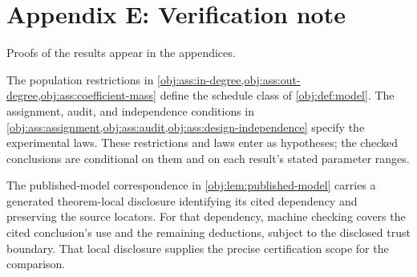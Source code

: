 \section{Appendix E: Verification note}

Proofs of the results appear in the appendices.

The population restrictions in \cref{obj:ass:in-degree,obj:ass:out-degree,obj:ass:coefficient-mass} define the schedule class of \cref{obj:def:model}. The assignment, audit, and independence conditions in \cref{obj:ass:assignment,obj:ass:audit,obj:ass:design-independence} specify the experimental laws. These restrictions and laws enter as hypotheses; the checked conclusions are conditional on them and on each result's stated parameter ranges.

The published-model correspondence in \cref{obj:lem:published-model} carries a generated theorem-local disclosure identifying its cited dependency and preserving the source locators. For that dependency, machine checking covers the cited conclusion's use and the remaining deductions, subject to the disclosed trust boundary. That local disclosure supplies the precise certification scope for the comparison.
